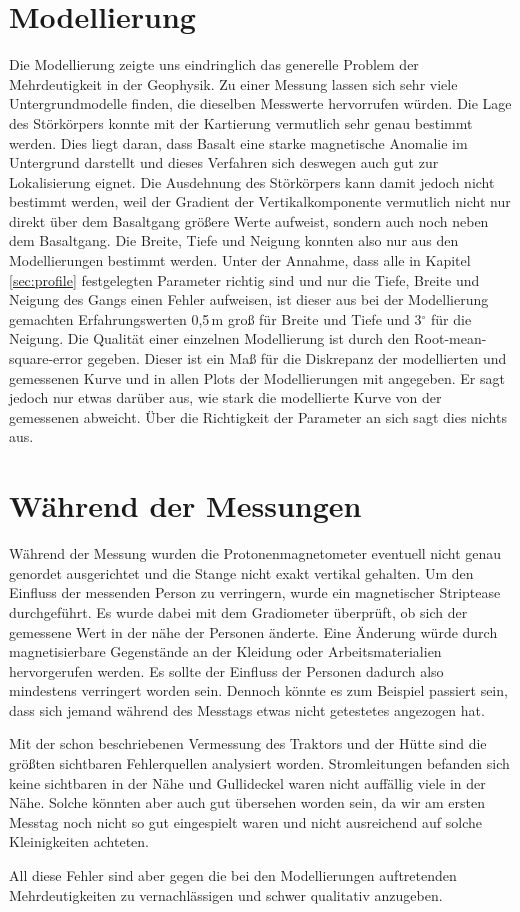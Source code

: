 \section{Modellierung}

Die Modellierung zeigte uns eindringlich das generelle Problem der Mehrdeutigkeit in der Geophysik. Zu einer Messung lassen sich sehr viele Untergrundmodelle finden, die dieselben Messwerte hervorrufen würden. Die Lage des Störkörpers konnte mit der Kartierung vermutlich sehr genau bestimmt werden. Dies liegt daran, dass Basalt eine starke magnetische Anomalie im Untergrund darstellt und dieses Verfahren sich deswegen auch gut zur Lokalisierung eignet. Die Ausdehnung des Störkörpers kann damit jedoch nicht bestimmt werden, weil der Gradient der Vertikalkomponente vermutlich nicht nur direkt über dem Basaltgang größere Werte aufweist, sondern auch noch neben dem Basaltgang. Die Breite, Tiefe und Neigung konnten also nur aus den Modellierungen bestimmt werden. Unter der Annahme, dass alle in Kapitel \ref{sec:profile} festgelegten Parameter richtig sind und nur die Tiefe, Breite und Neigung des Gangs einen Fehler aufweisen, ist dieser aus bei der Modellierung gemachten Erfahrungswerten 0,5\,m groß für Breite und Tiefe und 3$^\circ$ für die Neigung. Die Qualität einer einzelnen Modellierung ist durch den Root-mean-square-error gegeben. Dieser ist ein Maß für die Diskrepanz der modellierten und gemessenen Kurve und in allen Plots der Modellierungen mit angegeben. Er sagt jedoch nur etwas darüber aus, wie stark die modellierte Kurve von der gemessenen abweicht. Über die Richtigkeit der Parameter an sich sagt dies nichts aus.

\section{Während der Messungen}

Während der Messung wurden die Protonenmagnetometer eventuell nicht genau genordet ausgerichtet und die Stange nicht exakt vertikal gehalten.
Um den Einfluss der messenden Person zu verringern, wurde ein magnetischer Striptease durchgeführt. Es wurde dabei mit dem Gradiometer überprüft, ob sich der gemessene Wert in der nähe der Personen änderte. Eine Änderung würde durch magnetisierbare Gegenstände an der Kleidung oder Arbeitsmaterialien hervorgerufen werden. Es sollte der Einfluss der Personen dadurch also mindestens verringert worden sein. Dennoch könnte es zum Beispiel passiert sein, dass sich jemand während des Messtags etwas nicht getestetes angezogen hat.

Mit der schon beschriebenen Vermessung des Traktors und der Hütte sind die größten sichtbaren Fehlerquellen analysiert worden. Stromleitungen befanden sich keine sichtbaren in der Nähe und Gullideckel waren nicht auffällig viele in der Nähe. Solche könnten aber auch gut übersehen worden sein, da wir am ersten Messtag noch nicht so gut eingespielt waren und nicht ausreichend auf solche Kleinigkeiten achteten.

All diese Fehler sind aber gegen die bei den Modellierungen auftretenden Mehrdeutigkeiten zu vernachlässigen und schwer qualitativ anzugeben.